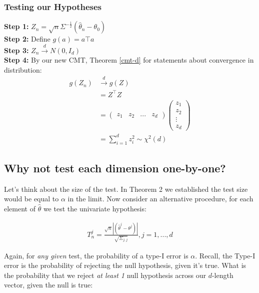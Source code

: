 \documentclass{article}
\begin{document}
    \subsubsection*{Testing our Hypotheses}

    \textbf{Step 1:}
    $Z_n = \sqrt{n}\Sigma^{-\frac{1}{2}} ( \hat{\theta}_n - \theta_0)$
    \\
    \textbf{Step 2:}
    Define $g(a) = a\top a$
    \\
    \textbf{Step 3:}
    $Z_n \xrightarrow{d} N(0, I_d)$
    \\
    \textbf{Step 4:}
    By our new CMT, Theorem \ref{cmt-d} for statements about convergence in distribution:
    \begin{align*}
        g(Z_n) &\xrightarrow{d} g(Z) \\ 
        &= Z^\top Z \\
        &= \begin{pmatrix}
            z_1 & z_2 & ... & z_d
        \end{pmatrix}
         \begin{pmatrix}
            z_1 \\
            z_2 \\
            \vdots \\
            z_d
        \end{pmatrix} \\
        &= \sum^d_{i=1} z_i^2 \sim \chi^2(d)
    \end{align*}



    \subsection*{Why not test each dimension one-by-one?}

    Let's think about the size of the test. In Theorem 2 we established the test 
    size would be equal to $\alpha$ in the limit. Now consider an alternative procedure, 
    for each element of $\hat{\theta}$ we test the univariate hypothesis:
    
    \begin{align*}
        T_n^j = \frac{\sqrt{n}|(\hat{\theta}^j - \theta^j)|}{\sqrt{\Sigma_{j,j}}}, j = 1, ..., d
    \end{align*}

    Again, for \textit{any given} test, the probability of a type-I error is $\alpha$. Recall, 
    the Type-I error is the probability of rejecting the null hypothesis, given it's true. 
    What is the probability that we reject \textit{at least 1} null hypothesis across 
    our $d$-length vector, given the null is true:
\end{document}
